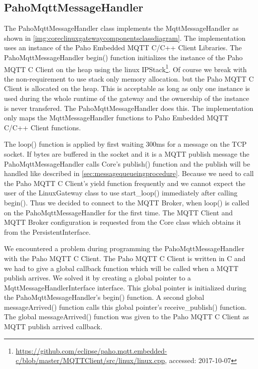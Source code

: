 \subsection{PahoMqttMessageHandler}\label{sec:pahomqttmessagehandler}
The PahoMqttMessageHandler class implements the MqttMessageHandler as shown in \autoref{img:coreclinuxgatewaycomponentsclassdiagram}.
The implementation uses an instance of the Paho Embedded MQTT C/C++ Client Libraries\cite{PahoMqttEmbbeddedcClient}.
The PahoMqttMessageHandler begin() function initializes the instance of the Paho MQTT C Client on the heap using the linux IPStack\footnote{\url{https://github.com/eclipse/paho.mqtt.embedded-c/blob/master/MQTTClient/src/linux/linux.cpp}, accessed: 2017-10-07}.
Of course we break with the non-requirement to use stack only memory allocation. but the Paho MQTT C Client is allocated on the heap.
This is acceptable as long as only one instance is used during the whole runtime of the gateway and the ownership of the instance is never transfered.
The PahoMqttMessageHandler does this.
The implementation only maps the MqttMessageHandler functions to Paho Embedded MQTT C/C++ Client functions.

The loop() function is applied by first waiting 300ms for a message on the TCP socket.
If bytes are buffered in the socket and it is a MQTT publish message the PahoMqttMessageHandler calls Core's publish() function and the publish will be handled like described in \autoref{sec:messagequeueingprocedure}.
Because we need to call the Paho MQTT C Client's yield function frequently and we cannot expect the user of the LinuxGateway class to use start\_loop() immediately after calling begin().
Thus we decided to connect to the MQTT Broker, when loop() is called on the PahoMqttMessageHandler for the first time.
The MQTT Client and MQTT Broker configuration is requested from the Core class which obtains it from the PersistentInterface.

We encountered a problem during programming the PahoMqttMessageHandler with the Paho MQTT C Client.
The Paho MQTT C Client is written in C and we had to give a global callback function which will be called when a MQTT publish arrives.
We solved it by creating a global pointer to a MqttMessageHandlerInterface interface.
This global pointer is initialized during the PahoMqttMessageHandler's begin() function.
A second global messageArrived() function calls this global pointer's receive\_publish() function.
The global messageArrived() function was given to the Paho MQTT C Client as MQTT publish arrived callback.
